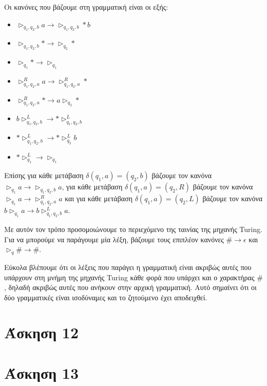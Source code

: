 \documentclass[a4paper, oneside, 11pt]{article}
\theoremstyle{definition}
\begin{document}
Οι κανόνες που βάζουμε στη γραμματική είναι οι εξής:
\begin{itemize}
\item{$\triangleright_{q_1,q_2,b} a\rightarrow \triangleright_{q_1,q_2,b}*b$}
\item{$\triangleright_{q_1,q_2,b}*\rightarrow\triangleright_{q_2}*$}
\item{$\triangleright_{q_1}*\rightarrow\triangleright_{q_1}$}
\item{$\triangleright_{q_1,q_2,a}^R a\rightarrow \triangleright_{q_1,q_2,a}^R*$}
\item{$\triangleright_{q_1,q_2,a}^R*\rightarrow a\triangleright_{q_2}*$}
\item{$b\triangleright_{q_1,q_2,b}^L\rightarrow *\triangleright_{q_1,q_2,b}^L$}
\item{$*\triangleright_{q_1,q_2,b}^L\rightarrow *\triangleright_{q_2}^L b$}
\item{$*\triangleright_{q_1}^L\rightarrow \triangleright_{q_1}$}
\end{itemize}

Επίσης για κάθε μετάβαση $\delta(q_1,a)=(q_2,b)$ βάζουμε τον κανόνα $\triangleright_{q_1}a\rightarrow \triangleright_{q_1,q_2,b}a$,
για κάθε μετάβαση $\delta(q_1,a)=(q_2,R)$ βάζουμε τον κανόνα $\triangleright_{q_1}a\rightarrow\triangleright_{q_1,q_2,a}^R a$
και για κάθε μετάβαση $\delta(q_1,a)=(q_2,L)$ βάζουμε τον κανόνα $b\triangleright_{q_1}a\rightarrow b\triangleright_{q_1,q_2,b}^L a$.

Με αυτόν τον τρόπο προσομοιώνουμε το περιεχόμενο της ταινίας της μηχανής Turing. Για να μπορούμε να παράγουμε μία λέξη, βάζουμε τους επιπλέον κανόνες
$\#\rightarrow \epsilon$ και $\triangleright_q \#\rightarrow \#$.

Εύκολα βλέπουμε ότι οι λέξεις που παράγει η γραμματική είναι ακριβώς αυτές που υπάρχουν στη μνήμη της μηχανής Turing κάθε φορά που υπάρχει και ο
χαρακτήρας $\#$, δηλαδή ακριβώς αυτές που ανήκουν στην αρχική γραμματική. Αυτό σημαίνει ότι οι δύο γραμματικές είναι ισοδύναμες και το ζητούμενο έχει
αποδειχθεί.

\section*{Άσκηση 12}
\section*{Άσκηση 13}
\end{document}
